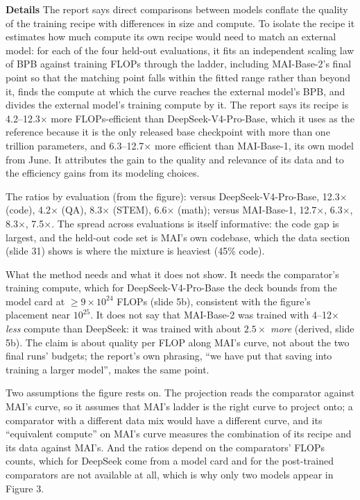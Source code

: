 \documentclass[11pt,letterpaper]{article}
\newcommand{\para}[1]{\medskip\noindent\textbf{#1}\quad}
\begin{document}
\para{Details} The report says direct comparisons between models conflate the quality of the training recipe with differences in size and compute. To isolate the recipe it estimates how much compute its own recipe would need to match an external model: for each of the four held-out evaluations, it fits an independent scaling law of BPB against training FLOPs through the ladder, including MAI-Base-2's final point so that the matching point falls within the fitted range rather than beyond it, finds the compute at which the curve reaches the external model's BPB, and divides the external model's training compute by it. The report says its recipe is 4.2--12.3$\times$ more FLOPs-efficient than DeepSeek-V4-Pro-Base, which it uses as the reference because it is the only released base checkpoint with more than one trillion parameters, and 6.3--12.7$\times$ more efficient than MAI-Base-1, its own model from June. It attributes the gain to the quality and relevance of its data and to the efficiency gains from its modeling choices.

The ratios by evaluation (from the figure): versus DeepSeek-V4-Pro-Base, 12.3$\times$ (code), 4.2$\times$ (QA), 8.3$\times$ (STEM), 6.6$\times$ (math); versus MAI-Base-1, 12.7$\times$, 6.3$\times$, 8.3$\times$, 7.5$\times$. The spread across evaluations is itself informative: the code gap is largest, and the held-out code set is MAI's own codebase, which the data section (slide 31) shows is where the mixture is heaviest (45\% code).

What the method needs and what it does not show. It needs the comparator's training compute, which for DeepSeek-V4-Pro-Base the deck bounds from the model card at $\ge9\times10^{24}$ FLOPs (slide 5b), consistent with the figure's placement near $10^{25}$. It does not say that MAI-Base-2 was trained with 4--12$\times$ \emph{less} compute than DeepSeek: it was trained with about $2.5\times$ \emph{more} (derived, slide 5b). The claim is about quality per FLOP along MAI's curve, not about the two final runs' budgets; the report's own phrasing, ``we have put that saving into training a larger model'', makes the same point.

Two assumptions the figure rests on. The projection reads the comparator against MAI's curve, so it assumes that MAI's ladder is the right curve to project onto; a comparator with a different data mix would have a different curve, and its ``equivalent compute'' on MAI's curve measures the combination of its recipe and its data against MAI's. And the ratios depend on the comparators' FLOPs counts, which for DeepSeek come from a model card and for the post-trained comparators are not available at all, which is why only two models appear in Figure 3.
\end{document}
